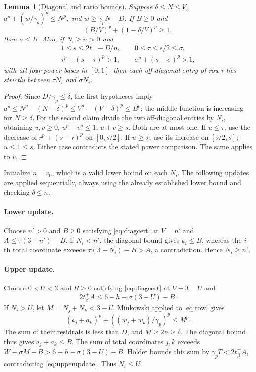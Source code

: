 \documentclass[11pt,a4paper]{article}
\newtheorem{lemma}[theorem]{Lemma}
\theoremstyle{remark}\newtheorem{remark}[theorem]{Remark}
\begin{document}
\begin{lemma}[Diagonal and ratio bounds]\label{lem:contract}
Suppose $\delta\le N\le V$, $a^p+(w/\gamma_p)^p\le N^p$,
and $w\ge\gamma_pN-D$. If $B\ge0$ and
\begin{equation}\label{eq:diagcert}
(B/V)^p+(1-\delta/V)^p\ge1,
\end{equation}
then $a\le B$. Also, if $N_i\ge n>0$ and
\begin{equation}\label{eq:ratiocert}
\begin{gathered}
1\le s\le2t_--D/n,\qquad0\le\tau\le s/2\le\sigma,\\
\tau^p+(s-\tau)^p>1,\qquad\sigma^p+(s-\sigma)^p>1,
\end{gathered}
\end{equation}
with all four power bases in $[0,1]$, then each off-diagonal entry of
row $i$ lies strictly between $\tau N_i$ and $\sigma N_i$.
\end{lemma}
\begin{proof}
Since $D/\gamma_p\le\delta$, the first hypotheses imply
$a^p\le N^p-(N-\delta)^p\le V^p-(V-\delta)^p\le B^p$;
the middle function is increasing for $N\ge\delta$.
For the second claim divide the two off-diagonal entries by $N_i$,
obtaining $u,v\ge0$, $u^p+v^p\le1$, $u+v\ge s$. Both are at most one.
If $u\le\tau$, use the decrease of $r^p+(s-r)^p$ on $[0,s/2]$.
If $u\ge\sigma$, use its increase on $[s/2,s]$; $u\le1\le s$.
Either case contradicts the stated power comparison. The same applies to $v$.
\end{proof}

Initialize $n=v_0$, which is a valid lower bound on each $N_i$.
The following updates are applied sequentially, always using the already
established lower bound and checking $\delta\le n$.

\paragraph{Lower update.}
Choose $n'>0$ and $B\ge0$ satisfying \eqref{eq:diagcert} at $V=n'$ and
$A\le\tau(3-n')-B$. If $N_i<n'$, the diagonal bound gives $a_i\le B$,
whereas the $i$th total coordinate exceeds
$\tau(3-N_i)-B>A$, a contradiction. Hence $N_i\ge n'$.

\paragraph{Upper update.}
Choose $0<U<3$ and $B\ge0$ satisfying \eqref{eq:diagcert} at $V=3-U$ and
\begin{equation}\label{eq:upperupdate}
2t_\beta^+A\le6-h-\sigma(3-U)-B.
\end{equation}
If $N_i>U$, let $M=N_j+N_k<3-U$. Minkowski applied to
\eqref{eq:row} gives
\[
(a_j+a_k)^p+((w_j+w_k)/\gamma_p)^p\le M^p.
\]
The sum of their residuals is less than $D$, and $M\ge2n\ge\delta$.
The diagonal bound thus gives $a_j+a_k\le B$. The sum of total
coordinates $j,k$ exceeds
$W-\sigma M-B>6-h-\sigma(3-U)-B$.
H\"older bounds this sum by $\gamma_pT<2t_\beta^+A$, contradicting
\eqref{eq:upperupdate}. Thus $N_i\le U$.
\end{document}
